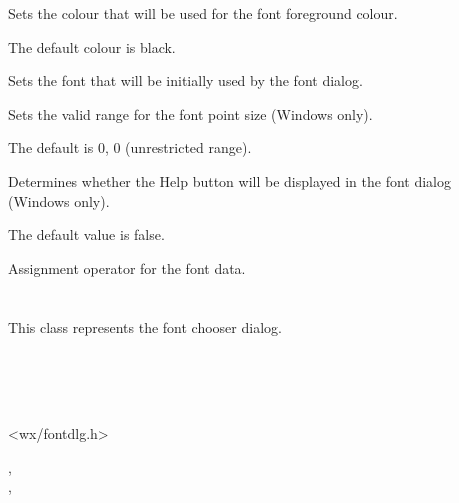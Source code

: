 Sets the colour that will be used for the font foreground colour.

The default colour is black.

\label{wxfontdatasetinitialfont}


Sets the font that will be initially used by the font dialog.

\label{wxfontdatasetrange}


Sets the valid range for the font point size (Windows only).

The default is 0, 0 (unrestricted range).

\label{wxfontdatasetshowhelp}


Determines whether the Help button will be displayed in the font dialog (Windows only).

The default value is false.

\label{wxfontdataassign}


Assignment operator for the font data.

\section{}\label{wxfontdialog}

This class represents the font chooser dialog.


\\
\\
\\


<wx/fontdlg.h>




,\\
,\\

